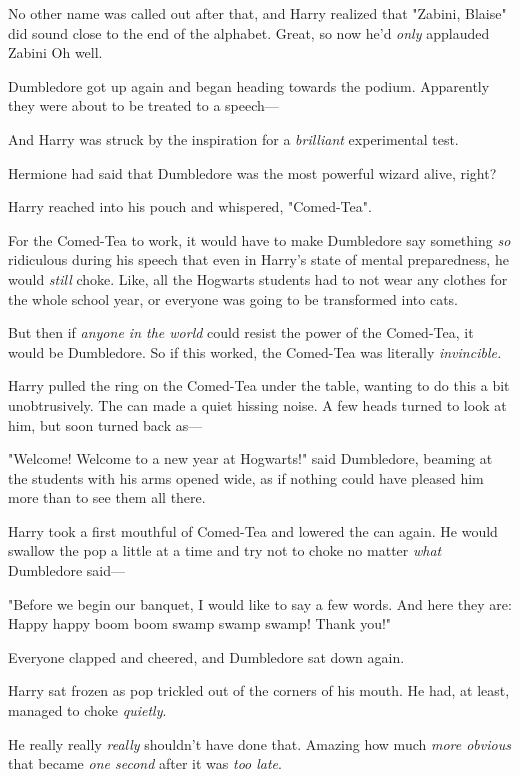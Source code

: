 No other name was called out after that, and Harry realized that "Zabini,
Blaise" did sound close to the end of the alphabet. Great, so now he'd
\emph{only} applauded Zabini{\el} Oh well.

Dumbledore got up again and began heading towards the podium. Apparently they
were about to be treated to a speech—

And Harry was struck by the inspiration for a \emph{brilliant} experimental
test.

Hermione had said that Dumbledore was the most powerful wizard alive, right?

Harry reached into his pouch and whispered, "Comed-Tea".

For the Comed-Tea to work, it would have to make Dumbledore say something
\emph{so} ridiculous during his speech that even in Harry's state of mental
preparedness, he would \emph{still} choke. Like, all the Hogwarts students had
to not wear any clothes for the whole school year, or everyone was going to be
transformed into cats.

But then if \emph{anyone in the world} could resist the power of the Comed-Tea,
it would be Dumbledore. So if this worked, the Comed-Tea was literally
\emph{invincible.}

Harry pulled the ring on the Comed-Tea under the table, wanting to do this a
bit unobtrusively. The can made a quiet hissing noise. A few heads turned to
look at him, but soon turned back as—

"Welcome! Welcome to a new year at Hogwarts!" said Dumbledore, beaming at the
students with his arms opened wide, as if nothing could have pleased him more
than to see them all there.

Harry took a first mouthful of Comed-Tea and lowered the can again. He would
swallow the pop a little at a time and try not to choke no matter \emph{what}
Dumbledore said—

"Before we begin our banquet, I would like to say a few words. And here they
are: Happy happy boom boom swamp swamp swamp! Thank you!"

Everyone clapped and cheered, and Dumbledore sat down again.

Harry sat frozen as pop trickled out of the corners of his mouth. He had, at
least, managed to choke \emph{quietly}.

He really really \emph{really} shouldn't have done that. Amazing how much \emph{
more obvious} that became \emph{one second} after it was \emph{too late}.

